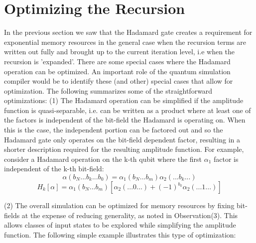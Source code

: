 \documentclass[reqno]{amsart}
\theoremstyle{definition}
\theoremstyle{remark}
\begin{document}
\newpage
\section{Optimizing the Recursion}
\noindent
In the previous section we saw that the Hadamard gate creates a requirement for exponential memory resources in the general case when the recursion terms are written out fully and brought up to the current iteration level, i.e when the recursion is 'expanded'. There are some special cases where the Hadamard operation can be optimized. An important role of the quantum simulation compiler would be to identify these (and other) special cases that allow for optimization. The following summarizes some of the straightforward optimizations:
\newline
\newline
(1) The Hadamard operation can be simplified if the amplitude function is quasi-separable, i.e. can be written as a product where at least one of the factors is independent of the bit-field the Hadamard is operating on. When this is the case, the independent portion can be factored out and so the Hadamard gate only operates on the bit-field dependent factor, resulting in a shorter description required for the resulting amplitude function. For example, consider a Hadamard operation on the k-th qubit where the first $\alpha_1$ factor is independent of the k-th bit-field:
\newline
\newline
\begin{equation}
\alpha(b_N ... b_k ...b_0)  = \alpha_1(b_N ... b_m)\alpha_2(... b_k ...)
\end{equation}
\begin{equation}
H_k[{\alpha}] =  \alpha_1(b_N ... b_m) [\alpha_2(...0...) + (-1)^{b_k} \alpha_2(... 1 ... )]
\end{equation} \newline


(2) The overall simulation can be optimized for memory resources by fixing bit-fields at the expense of reducing generality, as noted in Observation(3). This allows classes of input states to be explored while simplifying the amplitude function. The following simple example illustrates this type of optimization:
\newline
\newline
\end{document}
